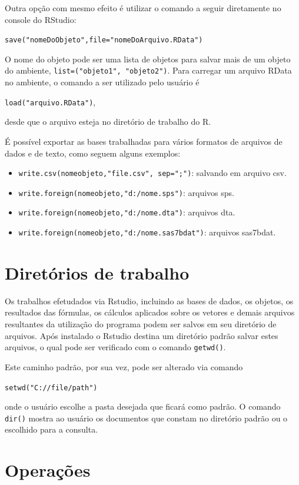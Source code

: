 \documentclass[12pt,brazil,oneside]{book}
\providecommand{\tightlist}{%
  \setlength{\itemsep}{0pt}\setlength{\parskip}{0pt}}
\begin{document}
Outra opção com mesmo efeito é utilizar o comando a seguir diretamente
no console do RStudio:

\texttt{save("nomeDoObjeto",file="nomeDoArquivo.RData")}

O nome do objeto pode ser uma lista de objetos para salvar mais de um
objeto do ambiente, \texttt{list=("objeto1",\ "objeto2")}. Para carregar
um arquivo RData no ambiente, o comando a ser utilizado pelo usuário é

\texttt{load("arquivo.RData")},

desde que o arquivo esteja no diretório de trabalho do R.

É possível exportar as bases trabalhadas para vários formatos de
arquivos de dados e de texto, como seguem alguns exemplos:

\begin{itemize}
\tightlist
\item
  \texttt{write.csv(nomeobjeto,"file.csv",\ sep=";")}: salvando em
  arquivo csv.
\item
  \texttt{write.foreign(nomeobjeto,"d:/nome.sps")}: arquivos sps.
\item
  \texttt{write.foreign(nomeobjeto,"d:/nome.dta")}: arquivos dta.
\item
  \texttt{write.foreign(nomeobjeto,"d:/nome.sas7bdat")}: arquivos
  sas7bdat.
\end{itemize}

\hypertarget{diretorios-de-trabalho}{%
\section{Diretórios de trabalho}\label{diretorios-de-trabalho}}

Os trabalhos efetudados via Rstudio, incluindo as bases de dados, os
objetos, os resultados das fórmulas, os cálculos aplicados sobre os
vetores e demais arquivos resultantes da utilização do programa podem
ser salvos em seu diretório de arquivos. Após instalado o Rstudio
destina um diretório padrão salvar estes arquivos, o qual pode ser
verificado com o comando \texttt{getwd()}.

Este caminho padrão, por sua vez, pode ser alterado via comando

\texttt{setwd("C://file/path")}

onde o usuário escolhe a pasta desejada que ficará como padrão. O
comando \texttt{dir()} mostra ao usuário os documentos que constam no
diretório padrão ou o escolhido para a consulta.

\hypertarget{operacoes}{%
\section{Operações}\label{operacoes}}
\end{document}
